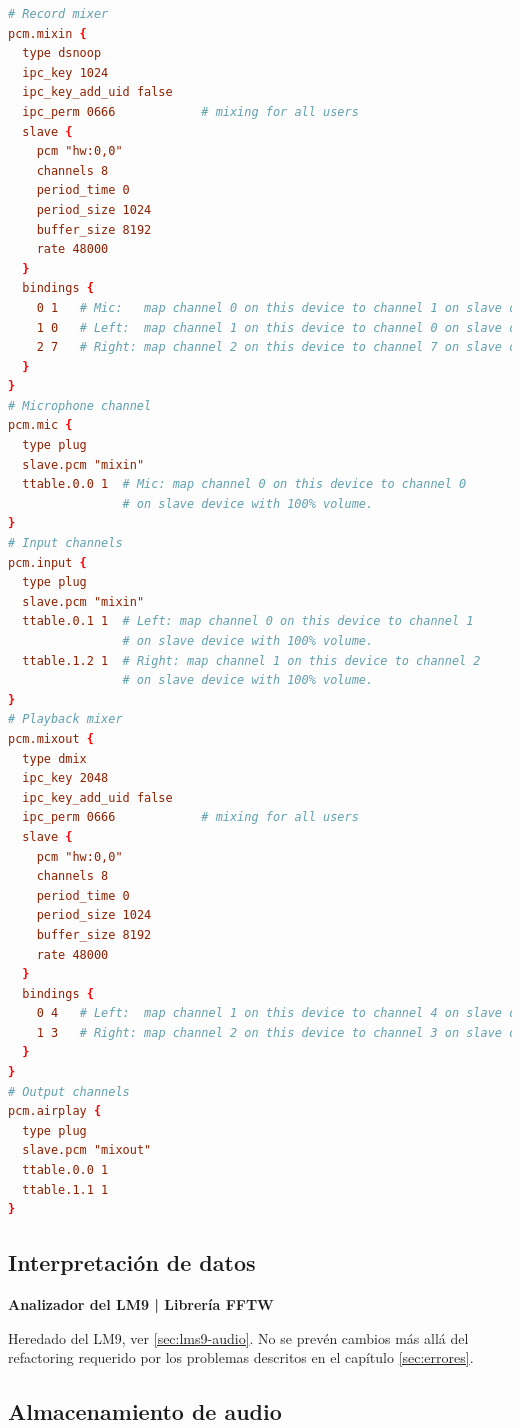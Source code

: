 \begin{lstlisting}[language={conf}, caption={Fichero asound.conf completamente configurado}, label={lst:lms11-asound}]
# Record mixer
pcm.mixin {
  type dsnoop
  ipc_key 1024
  ipc_key_add_uid false
  ipc_perm 0666            # mixing for all users
  slave {
    pcm "hw:0,0"
    channels 8
    period_time 0
    period_size 1024
    buffer_size 8192
    rate 48000
  }
  bindings {
    0 1   # Mic:   map channel 0 on this device to channel 1 on slave device
    1 0   # Left:  map channel 1 on this device to channel 0 on slave device
    2 7   # Right: map channel 2 on this device to channel 7 on slave device
  }
}
# Microphone channel
pcm.mic {
  type plug
  slave.pcm "mixin"
  ttable.0.0 1  # Mic: map channel 0 on this device to channel 0
                # on slave device with 100% volume.
}
# Input channels
pcm.input {
  type plug
  slave.pcm "mixin"
  ttable.0.1 1  # Left: map channel 0 on this device to channel 1
                # on slave device with 100% volume.
  ttable.1.2 1  # Right: map channel 1 on this device to channel 2
                # on slave device with 100% volume.
}
# Playback mixer
pcm.mixout {
  type dmix
  ipc_key 2048
  ipc_key_add_uid false
  ipc_perm 0666            # mixing for all users
  slave {
    pcm "hw:0,0"
    channels 8
    period_time 0
    period_size 1024
    buffer_size 8192
    rate 48000
  }
  bindings {
    0 4   # Left:  map channel 1 on this device to channel 4 on slave device
    1 3   # Right: map channel 2 on this device to channel 3 on slave device
  }
}
# Output channels
pcm.airplay {
  type plug
  slave.pcm "mixout"
  ttable.0.0 1
  ttable.1.1 1
}
\end{lstlisting}

\subsection{Interpretación de datos}

\begin{flushright}
\textbf{Analizador del \acrshort{LM9} | Librería \acrshort{FFTW}}
\end{flushright}

Heredado del \acrshort{LM9}, ver \ref{sec:lms9-audio}. No se prevén cambios más allá del refactoring requerido por los problemas descritos en el capítulo \ref{sec:errores}.

\subsection{Almacenamiento de audio}

